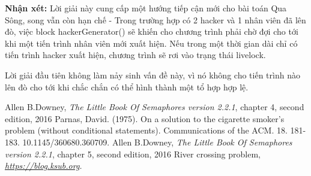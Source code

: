 \documentclass[a4paper]{article}
\begin{document}
	\textbf{Nhận xét: } Lời giải này cung cấp một hướng tiếp cận mới cho bài toán Qua Sông,
	song vẫn còn hạn chế - Trong trường hợp có 2 hacker và 1 nhân viên đã lên đò, việc block
	hackerGenerator() sẽ khiến cho chương trình phải chờ đợi cho tới khi một tiến trình nhân 
	viên mới xuất hiện. Nếu trong một thời gian dài chỉ có tiến trình hacker xuất hiện, chương
	trình sẽ rơi vào trạng thái livelock. 
	
	Lời giải đầu tiên không làm nảy sinh vấn đề này, vì nó không cho tiến trình nào lên đò 
	cho tới khi chắc chắn có thể hình thành một tổ hợp hợp lệ.

	\pagebreak
	\begin{thebibliography}{9}
  	Allen B.Downey,
  	\textit{The Little Book Of Semaphores version 2.2.1}, chapter 4, second edition, 2016
	\textit{}Parnas, David. (1975). On a solution to the cigarette smoker's problem (without conditional statements). Communications of the ACM. 18. 181-183. 10.1145/360680.360709. 
  	Allen B.Downey,
	\textit{The Little Book Of Semaphores version 2.2.1}, chapter 5, second edition, 2016
	River crossing problem, 
	\textit{\href{https://blog.ksub.org}{https://blog.ksub.org}.}
	\end{thebibliography}
\end{document}
